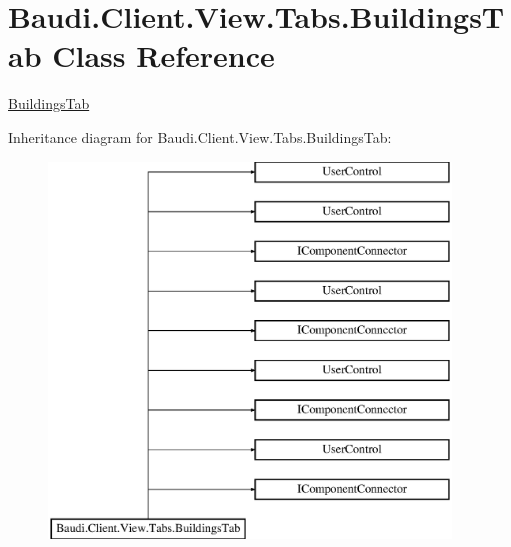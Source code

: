 \hypertarget{class_baudi_1_1_client_1_1_view_1_1_tabs_1_1_buildings_tab}{}\section{Baudi.\+Client.\+View.\+Tabs.\+Buildings\+Tab Class Reference}
\label{class_baudi_1_1_client_1_1_view_1_1_tabs_1_1_buildings_tab}


\hyperlink{class_baudi_1_1_client_1_1_view_1_1_tabs_1_1_buildings_tab}{Buildings\+Tab}  


Inheritance diagram for Baudi.\+Client.\+View.\+Tabs.\+Buildings\+Tab\+:\begin{figure}[H]
\begin{center}
\leavevmode
\includegraphics[height=10.000000cm]{class_baudi_1_1_client_1_1_view_1_1_tabs_1_1_buildings_tab}
\end{center}
\end{figure}
